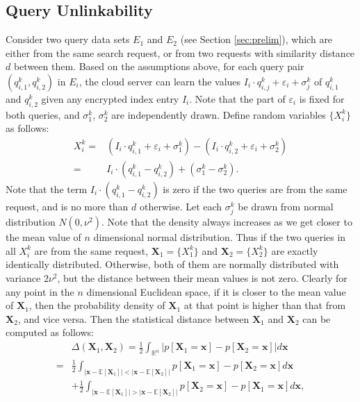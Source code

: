 \documentclass{IEEEtran}
\begin{document}
\subsection{Query Unlinkability}
Consider two query data sets $E_1$ and $E_2$ (see Section \ref{sec:prelim}), which are either from the same search request, or from two requests with similarity distance $d$ between them. Based on the assumptions above, for each query pair $(q_{i,1}^k,q_{i,2}^k)$ in $E_i$, the cloud server can learn the values $I_i\cdot q_{i,j}^k+\varepsilon_i+\sigma_j^k$ of $q_{i,1}^k$ and $q_{i,2}^k$ given any encrypted index entry $I_i$. Note that the part of $\varepsilon_i$ is fixed for both queries, and $\sigma_1^k$, $\sigma_2^k$ are independently drawn. Define random variables $\{X_i^k\}$ as follows:
$$
\begin{aligned}
X_i^k = &(I_i\cdot q_{i,1}^k+\varepsilon_i+\sigma_1^k) - (I_i\cdot q_{i,2}^k+\varepsilon_i+\sigma_2^k)\\
=&I_i\cdot(q_{i,1}^k-q_{i,2}^k)+(\sigma_1^k-\sigma_2^k).
\end{aligned}
$$
Note that the term $I_i\cdot(q_{i,1}^k-q_{i,2}^k)$ is zero if the two queries are from the same request, and is no more than $d$ otherwise. Let each $\sigma_j^k$ be drawn from normal distribution $N(0,\nu^2)$. Note that the density always increases as we get closer to the mean value of $n$ dimensional normal distribution. Thus if the two queries in all $X_i^k$ are from the same request, $\mathbf{X}_1 = \{X_1^k\}$ and $\mathbf{X}_2 = \{X_2^k\}$ are exactly identically distributed. Otherwise, both of them are normally distributed with variance $2\nu^2$, but the distance between their mean values is not zero. Clearly for any point in the $n$ dimensional Euclidean space, if it is closer to the mean value of $\mathbf{X}_1$, then the probability density of $\mathbf{X}_1$ at that point is higher than that from $\mathbf{X}_2$, and vice versa. Then the statistical distance between $\mathbf{X}_1$ and $\mathbf{X}_2$ can be computed as follows:
\newcommand{\norm}[1]{| #1 |}
$$\begin{aligned}
&\Delta(\mathbf{X}_1, \mathbf{X}_2) 
= \frac{1}{2}\int_{\mathbb{R}^n} \bigg| p[\mathbf{X}_1=\mathbf{x}] - p[\mathbf{X}_2=\mathbf{x}] \bigg| d\mathbf{x}\\
=& \frac{1}{2}\int_{\norm{\mathbf{x}-\mathbb{E}[\mathbf{X}_1]} < \norm{\mathbf{x}-\mathbb{E}[\mathbf{X}_2]}} p[\mathbf{X}_1=\mathbf{x}] - p[\mathbf{X}_2=\mathbf{x}]d\mathbf{x} \\
&+\frac{1}{2}\int_{\norm{\mathbf{x}-\mathbb{E}[\mathbf{X}_1]} > \norm{\mathbf{x}-\mathbb{E}[\mathbf{X}_2]}} p[\mathbf{X}_2=\mathbf{x}] - p[\mathbf{X}_1=\mathbf{x}]d\mathbf{x},
\end{aligned}$$
\end{document}

